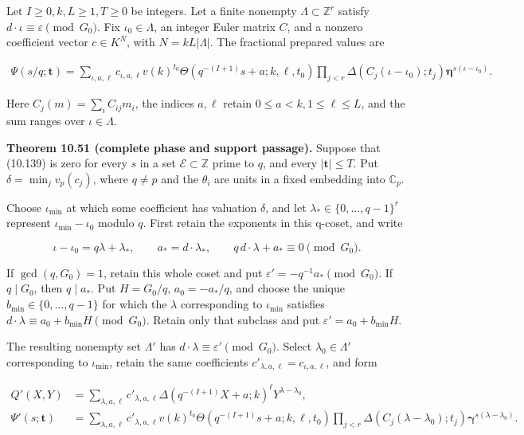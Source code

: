 \documentclass[
  11pt,
  a4paper,
]{article}
\newcounter{none} %
\begin{document}
Let \(I\ge0,k,L\ge1,T\ge0\) be integers. Let a finite nonempty
\(\Lambda\subset\mathbb Z^r\) satisfy
\(d\cdot\iota\equiv\varepsilon\pmod{G_0}\). Fix \(\iota_0\in\Lambda\),
an integer Euler matrix \(C\), and a nonzero coefficient vector
\(c\in K^N\), with \(N=kL|\Lambda|\). The fractional prepared values are

\[
\begin{aligned}
\Psi(s/q;\boldsymbol t)=
\sum_{\iota,a,\ell}c_{\iota,a,\ell}
v(k)^{t_0}\Theta(q^{-(I+1)}s+a;k,\ell,t_0)
\prod_{j<r}\Delta(C_j(\iota-\iota_0);t_j)
\boldsymbol\eta^{s(\iota-\iota_0)} .
\end{aligned}
\tag{10.139}
\]

Here \(C_j(m)=\sum_i C_{ij}m_i\), the indices \(a,\ell\) retain
\(0\le a<k,1\le\ell\le L\), and the sum ranges over \(\iota\in\Lambda\).

\textbf{Theorem 10.51 (complete phase and support passage).} Suppose
that (10.139) is zero for every \(s\) in a set
\(\mathcal E\subset\mathbb Z\) prime to \(q\), and every
\(|\boldsymbol t|\le T\). Put \(\delta=\min_jv_p(c_j)\), where
\(q\ne p\) and the \(\theta_i\) are units in a fixed embedding into
\(\mathbb C_p\).

Choose \(\iota_{\min}\) at which some coefficient has valuation
\(\delta\), and let \(\lambda_*\in\{0,\ldots,q-1\}^r\) represent
\(\iota_{\min}-\iota_0\) modulo \(q\). First retain the exponents in
this q-coset, and write

\[
\iota-\iota_0=q\lambda+\lambda_*,
\qquad a_*=d\cdot\lambda_*,
\qquad q\,d\cdot\lambda+a_*\equiv0\pmod{G_0}.
\tag{10.140}
\]

If \(\gcd(q,G_0)=1\), retain this whole coset and put
\(\varepsilon'=-q^{-1}a_*\pmod{G_0}\). If \(q\mid G_0\), then
\(q\mid a_*\). Put \(H=G_0/q\), \(a_0=-a_*/q\), and choose the unique
\(b_{\min}\in\{0,\ldots,q-1\}\) for which the \(\lambda\) corresponding
to \(\iota_{\min}\) satisfies
\(d\cdot\lambda\equiv a_0+b_{\min}H\pmod{G_0}\). Retain only that
subclass and put \(\varepsilon'=a_0+b_{\min}H\).

The resulting nonempty set \(\Lambda'\) has
\(d\cdot\lambda\equiv\varepsilon'\pmod{G_0}\). Select
\(\lambda_0\in\Lambda'\) corresponding to \(\iota_{\min}\), retain the
same coefficients \(c'_{\lambda,a,\ell}=c_{\iota,a,\ell}\), and form

\[
\begin{aligned}
Q'(X,Y)&=\sum_{\lambda,a,\ell}c'_{\lambda,a,\ell}
\Delta(q^{-(I+1)}X+a;k)^\ell
Y^{\lambda-\lambda_0},\\
\Psi'(s;\boldsymbol t)&=
\sum_{\lambda,a,\ell}c'_{\lambda,a,\ell}
v(k)^{t_0}\Theta(q^{-(I+1)}s+a;k,\ell,t_0)
\prod_{j<r}\Delta(C_j(\lambda-\lambda_0);t_j)
\boldsymbol\gamma^{s(\lambda-\lambda_0)} .
\end{aligned}
\tag{10.141}
\]
\end{document}
